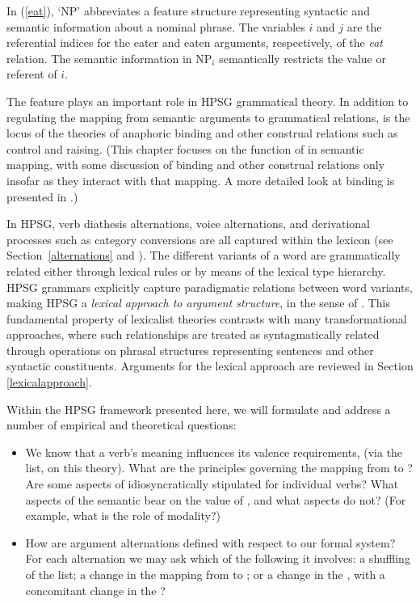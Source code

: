 \documentclass[output=paper
                ,modfonts
                ,nonflat
	        ,collection
	        ,collectionchapter
	        ,collectiontoclongg
 	        ,biblatex
                ,babelshorthands
                ,newtxmath
                ,draftmode
                ,colorlinks, citecolor=brown
]{./langsci/langscibook}
\begin{document}
	
\noindent
In (\ref{eat}), `NP' abbreviates a feature structure representing syntactic and semantic information about a nominal phrase.  The variables $i$ and 
$j$ are the referential indices for the eater and eaten arguments, respectively, of the \textit{eat} relation.  The semantic information in 
NP$_i$ semantically restricts the value or referent of $i$. 

The \argst feature plays an important  
role in HPSG grammatical theory.  In addition to regulating the mapping from semantic arguments to grammatical relations, \argst is the locus of the theories of anaphoric binding and other construal relations such as control and raising.  (This chapter focuses on the function of \argst  in semantic mapping, with some discussion of binding and other construal relations only insofar as they interact with that mapping.  A more detailed look at binding is presented in .)   

In HPSG, verb diathesis alternations, voice alternations, and derivational processes such as category conversions are all captured within the lexicon (see Section~\ref{alternations} and ).  The different variants of a word are grammatically related either through lexical rules or by means of the lexical type hierarchy.  HPSG grammars explicitly capture paradigmatic relations between word variants, making HPSG a \textit{lexical approach to argument structure}, in the sense of \citet{MWArgSt}.
This fundamental property of lexicalist theories contrasts with many transformational approaches, where such relationships are treated as syntagmatically related through operations on phrasal structures representing sentences and other syntactic constituents.  Arguments for the lexical approach are reviewed in Section \ref{lexicalapproach}.  

Within the HPSG framework presented here, we will formulate and address a number of empirical and theoretical questions: 

\begin{itemize}
\item We know that a verb's meaning influences its valence requirements, (via the \argst list, on this theory). 
 What are the principles governing the mapping from \content to \argst ?  Are some aspects of \argst idiosyncratically stipulated for individual verbs?  What aspects of the semantic \content  bear on the value of \argst, and what aspects do not?  (For example, what is the role of modality?)  
\item How are argument alternations defined with respect to our formal system?  For each alternation we may ask which of the following it involves: a shuffling of the \argst list;  a change in the mapping from \argst to \val; or  a change in the \content, with a concomitant change in the \argst?  
\end{itemize}
\end{document}
